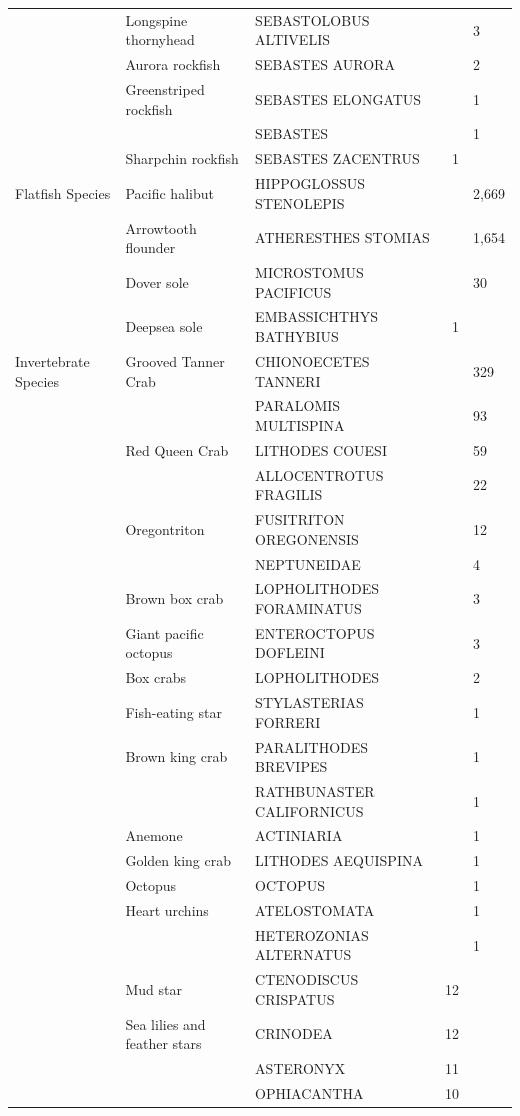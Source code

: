 \documentclass[12pt]{article}\usepackage[]{graphicx}\usepackage[]{color}
\begin{document}
\begin{longtable}[l]{lllrl}
 & Longspine thornyhead & SEBASTOLOBUS ALTIVELIS &  & 3\\
 & Aurora rockfish & SEBASTES AURORA &  & 2\\
 & Greenstriped rockfish & SEBASTES ELONGATUS &  & 1\\
 &  & SEBASTES &  & 1\\
 & Sharpchin rockfish & SEBASTES ZACENTRUS & 1 & \\
\midrule
Flatfish Species & Pacific halibut & HIPPOGLOSSUS STENOLEPIS &  & 2,669\\
 & Arrowtooth flounder & ATHERESTHES STOMIAS &  & 1,654\\
 & Dover sole & MICROSTOMUS PACIFICUS &  & 30\\
 & Deepsea sole & EMBASSICHTHYS BATHYBIUS & 1 & \\
\midrule
Invertebrate Species & Grooved Tanner Crab & CHIONOECETES TANNERI &  & 329\\
 &  & PARALOMIS MULTISPINA &  & 93\\
 & Red Queen Crab & LITHODES COUESI &  & 59\\
 &  & ALLOCENTROTUS FRAGILIS &  & 22\\
 & Oregontriton & FUSITRITON OREGONENSIS &  & 12\\
 &  & NEPTUNEIDAE &  & 4\\
 & Brown box crab & LOPHOLITHODES FORAMINATUS &  & 3\\
 & Giant pacific octopus & ENTEROCTOPUS DOFLEINI &  & 3\\
 & Box crabs & LOPHOLITHODES &  & 2\\
 & Fish-eating star & STYLASTERIAS FORRERI &  & 1\\
 & Brown king crab & PARALITHODES BREVIPES &  & 1\\
 &  & RATHBUNASTER CALIFORNICUS &  & 1\\
 & Anemone & ACTINIARIA &  & 1\\
 & Golden king crab & LITHODES AEQUISPINA &  & 1\\
 & Octopus & OCTOPUS &  & 1\\
 & Heart urchins & ATELOSTOMATA &  & 1\\
 &  & HETEROZONIAS ALTERNATUS &  & 1\\
 & Mud star & CTENODISCUS CRISPATUS & 12 & \\
 & Sea lilies and feather stars & CRINODEA & 12 & \\
 &  & ASTERONYX & 11 & \\
 &  & OPHIACANTHA & 10 & \\

\end{longtable}
\end{document}
